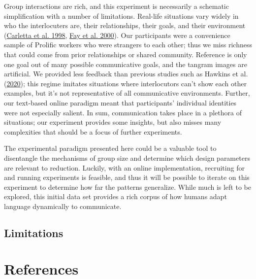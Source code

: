 \documentclass[
  english,
  a4paper,
]{article}
\begin{document}
Group interactions are rich, and this experiment is necessarily a schematic simplification with a number of limitations. Real-life situations vary widely in who the interlocuters are, their relationships, their goals, and their environment (\protect\hyperlink{ref-carletta1998}{Carletta et al. 1998}, \protect\hyperlink{ref-fay2000}{Fay et al. 2000}). Our participants were a convenience sample of Prolific workers who were strangers to each other; thus we miss richness that could come from prior relationships or shared community. Reference is only one goal out of many possible communicative goals, and the tangram images are artificial.
We provided less feedback than previous studies such as Hawkins et al. (\protect\hyperlink{ref-hawkinsCharacterizingDynamicsLearning2020}{2020}); this regime imitates situations where interlocutors can't show each other examples, but it's not representative of all communicative environments. Further, our text-based online paradigm meant that participants' individual identities were not especially salient. In sum, communication takes place in a plethora of situations; our experiment provides some insights, but also misses many complexities that should be a focus of further experiments.

The experimental paradigm presented here could be a valuable tool to disentangle the mechanisms of group size and determine which design parameters are relevant to reduction. Luckily, with an online implementation, recruiting for and running experiments is feasible, and thus it will be possible to iterate on this experiment to determine how far the patterns generalize. While much is left to be explored, this initial data set provides a rich corpus of how humans adapt language dynamically to communicate.

\hypertarget{limitations}{%
\subsection{Limitations}\label{limitations}}

\hypertarget{references}{%
\section{References}\label{references}}

\setlength{\parindent}{-0.1in} 
\setlength{\leftskip}{0.125in}

\noindent
\end{document}
